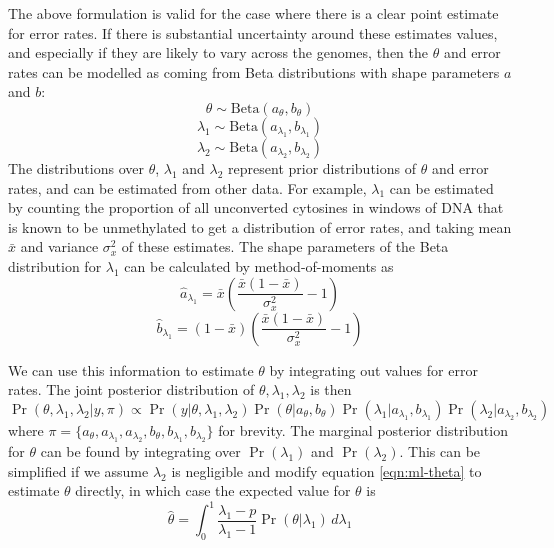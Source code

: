 \documentclass[12pt,longbibliography]{article}
\begin{document}
The above formulation is valid for the case where there is a clear point estimate for error rates.
If there is substantial uncertainty around these estimates values, and especially if they are likely to vary across the genomes, then the $\theta$ and error rates can be modelled as coming from Beta distributions with shape parameters $a$ and $b$:
$$ \theta \sim \textrm{Beta}(a_{\theta}, b_{\theta}) $$
$$ \lambda_1 \sim \textrm{Beta}(a_{\lambda_1}, b_{\lambda_1}) $$
$$ \lambda_2 \sim \textrm{Beta}(a_{\lambda_2}, b_{\lambda_2}) $$
The distributions over $\theta$, $\lambda_1$ and $\lambda_2$ represent prior distributions of $\theta$ and error rates, and can be estimated from other data.
For example, $\lambda_1$ can be estimated by counting the proportion of all unconverted cytosines in windows of DNA that is known to be unmethylated to get a distribution of error rates, and taking mean $\bar{x}$ and variance $\sigma^2_x$ of these estimates.
The shape parameters of the Beta distribution for $\lambda_1$ can be calculated by method-of-moments as
\begin{equation}
    \hat{a}_{\lambda_1} = \bar{x}(\frac{\bar{x}(1-\bar{x})}{\sigma^2_x}-1)
    \label{eqn:beta-a}
\end{equation}
\begin{equation}
    \hat{b}_{\lambda_1} = (1-\bar{x})(\frac{\bar{x}(1-\bar{x})}{\sigma^2_x}-1) 
    \label{eqn:beta-b}
\end{equation}

We can use this information to estimate $\theta$ by integrating out values for error rates.
The joint posterior distribution of $\theta, \lambda_1, \lambda_2$ is then
\begin{equation}
    \Pr(\theta, \lambda_1, \lambda_2 | y, \pi)
    \propto 
    \Pr(y | \theta, \lambda_1, \lambda_2)
    \Pr(\theta | a_{\theta}, b_{\theta})
    \Pr(\lambda_1 | a_{\lambda_1}, b_{\lambda_1})
    \Pr(\lambda_2 | a_{\lambda_2}, b_{\lambda_2})
\end{equation}
where $\pi=\{a_{\theta}, a_{\lambda_1}, a_{\lambda_2}, b_{\theta}, b_{\lambda_1}, b_{\lambda_2}\}$ for brevity.
The marginal posterior distribution for $\theta$ can be found by integrating over $\Pr(\lambda_1)$ and $\Pr(\lambda_2)$.
This can be simplified if we assume $\lambda_2$ is negligible and modify  equation \ref{eqn:ml-theta} to estimate $\theta$ directly, in which case the expected value for $\theta$ is
\begin{equation}
    \hat{\theta} = 
    \int_0^1 
    \frac{\lambda_1 - p} {\lambda_1 - 1}
    \Pr(\theta | \lambda_1) \,d\lambda_1
    \label{eqn:theta-with-uncertainty}
\end{equation}
\end{document}
